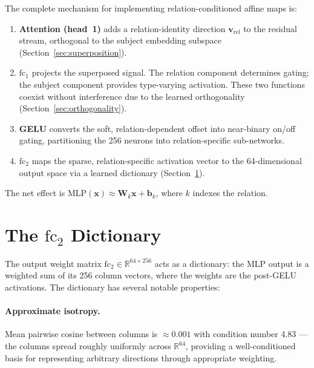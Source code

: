 \documentclass[11pt,a4paper]{article}
\newcommand{\R}{\mathbb{R}}
\newcommand{\bW}{\mathbf{W}}
\newcommand{\bb}{\mathbf{b}}
\newcommand{\bx}{\mathbf{x}}
\newcommand{\bv}{\mathbf{v}}
\newcommand{\fc}{\mathrm{fc}}
\begin{document}
The complete mechanism for implementing relation-conditioned affine
maps is:

\begin{enumerate}
\item \textbf{Attention (head~1)} adds a relation-identity direction
  $\bv_{\text{rel}}$ to the residual stream, orthogonal to the subject
  embedding subspace (Section~\ref{sec:superposition}).

\item \textbf{$\fc_1$} projects the superposed signal. The relation
  component determines gating; the subject component provides
  type-varying activation. These two functions coexist without
  interference due to the learned orthogonality
  (Section~\ref{sec:orthogonality}).

\item \textbf{GELU} converts the soft, relation-dependent offset into
  near-binary on/off gating, partitioning the 256 neurons into
  relation-specific sub-networks.

\item \textbf{$\fc_2$} maps the sparse, relation-specific activation
  vector to the 64-dimensional output space via a learned dictionary
  (Section~\ref{sec:dictionary}).
\end{enumerate}

\noindent The net effect is
$\mathrm{MLP}(\bx) \approx \bW_k \bx + \bb_k$,
where $k$ indexes the relation.

\section{The $\fc_2$ Dictionary}
\label{sec:dictionary}

The output weight matrix $\fc_2 \in \R^{64 \times 256}$ acts as a
dictionary: the MLP output is a weighted sum of its 256 column vectors,
where the weights are the post-GELU activations. The dictionary has
several notable properties:

\paragraph{Approximate isotropy.}
Mean pairwise cosine between columns is $\approx 0.001$ with condition
number 4.83 --- the columns spread roughly uniformly across $\R^{64}$,
providing a well-conditioned basis for representing arbitrary
directions through appropriate weighting.
\end{document}
